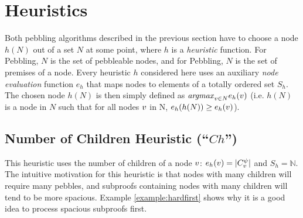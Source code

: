 \documentclass{llncs}
\newcommand{\Children}[2]{C_{#1}^{#2}}
\begin{document}
\section{Heuristics}
\label{sec:heuristics}

Both pebbling algorithms described in the previous section have to choose a node $h(N)$ out of a set $N$ at some point, where $h$ is a \emph{heuristic} function. For  Pebbling, $N$ is the set of pebbleable nodes, and for  Pebbling, $N$ is the set of premises of a node. Every heuristic $h$ considered here uses an auxiliary \emph{node evaluation} function $e_h$ that maps nodes to elements of a totally ordered set $S_h$. The chosen node $h(N)$ is then simply defined as $\mathit{argmax}_{v \in N} e_h(v)$ (i.e. $h(N)$ is a node in $N$ such that for all nodes $v$ in N, $e_h(h(N)) \geq e_h(v)$).

\subsection{Number of Children Heuristic (``$Ch$'')}
\label{sec:children}
This heuristic uses the number of children of a node $v$: $e_h(\n) = |\Children{\n}{\psi}|$ and $S_h = \mathbb{N}$.
The intuitive motivation for this heuristic is that nodes with many children will require many pebbles, and subproofs containing nodes with many children will tend to be more spacious. Example \ref{example:hardfirst} shows why it is a good idea to process spacious subproofs first.
\end{document}
